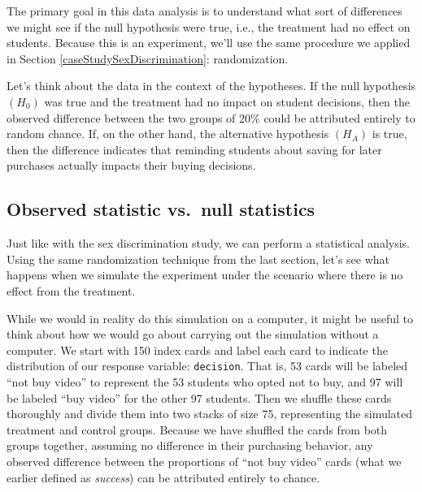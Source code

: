 \documentclass[
  10pt,
  openany]{book}
\begin{document}
The primary goal in this data analysis is to understand what sort of differences we might see if the null hypothesis were true, i.e., the treatment had no effect on students.
Because this is an experiment, we'll use the same procedure we applied in Section \ref{caseStudySexDiscrimination}: randomization.

Let's think about the data in the context of the hypotheses.
If the null hypothesis \((H_0)\) was true and the treatment had no impact on student decisions, then the observed difference between the two groups of 20\% could be attributed entirely to random chance.
If, on the other hand, the alternative hypothesis \((H_A)\) is true, then the difference indicates that reminding students about saving for later purchases actually impacts their buying decisions.

\hypertarget{observed-statistic-vs.-null-statistics-1}{%
\subsection{Observed statistic vs.~null statistics}\label{observed-statistic-vs.-null-statistics-1}}

Just like with the sex discrimination study, we can perform a statistical analysis.
Using the same randomization technique from the last section, let's see what happens when we simulate the experiment under the scenario where there is no effect from the treatment.

While we would in reality do this simulation on a computer, it might be useful to think about how we would go about carrying out the simulation without a computer.
We start with 150 index cards and label each card to indicate the distribution of our response variable: \texttt{decision}.
That is, 53 cards will be labeled ``not buy video'' to represent the 53 students who opted not to buy, and 97 will be labeled ``buy video'' for the other 97 students.
Then we shuffle these cards thoroughly and divide them into two stacks of size 75, representing the simulated treatment and control groups.
Because we have shuffled the cards from both groups together, assuming no difference in their purchasing behavior, any observed difference between the proportions of ``not buy video'' cards (what we earlier defined as \emph{success}) can be attributed entirely to chance.
\end{document}
